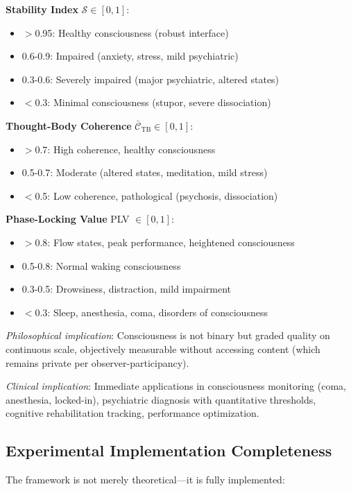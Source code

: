 \documentclass[11pt,onecolumn]{article}
\begin{document}
\textbf{Stability Index} $\mathcal{S} \in [0,1]$:
\begin{itemize}
\item $>$0.95: Healthy consciousness (robust interface)
\item 0.6-0.9: Impaired (anxiety, stress, mild psychiatric)
\item 0.3-0.6: Severely impaired (major psychiatric, altered states)
\item $<$0.3: Minimal consciousness (stupor, severe dissociation)
\end{itemize}

\textbf{Thought-Body Coherence} $\bar{\mathcal{C}}_{\text{TB}} \in [0,1]$:
\begin{itemize}
\item $>$0.7: High coherence, healthy consciousness
\item 0.5-0.7: Moderate (altered states, meditation, mild stress)
\item $<$0.5: Low coherence, pathological (psychosis, dissociation)
\end{itemize}

\textbf{Phase-Locking Value} PLV $\in [0,1]$:
\begin{itemize}
\item $>$0.8: Flow states, peak performance, heightened consciousness
\item 0.5-0.8: Normal waking consciousness
\item 0.3-0.5: Drowsiness, distraction, mild impairment
\item $<$0.3: Sleep, anesthesia, coma, disorders of consciousness
\end{itemize}

\textit{Philosophical implication}: Consciousness is not binary but graded quality on continuous scale, objectively measurable without accessing content (which remains private per observer-participancy).

\textit{Clinical implication}: Immediate applications in consciousness monitoring (coma, anesthesia, locked-in), psychiatric diagnosis with quantitative thresholds, cognitive rehabilitation tracking, performance optimization.

\subsection{Experimental Implementation Completeness}

The framework is not merely theoretical---it is fully implemented:
\end{document}
